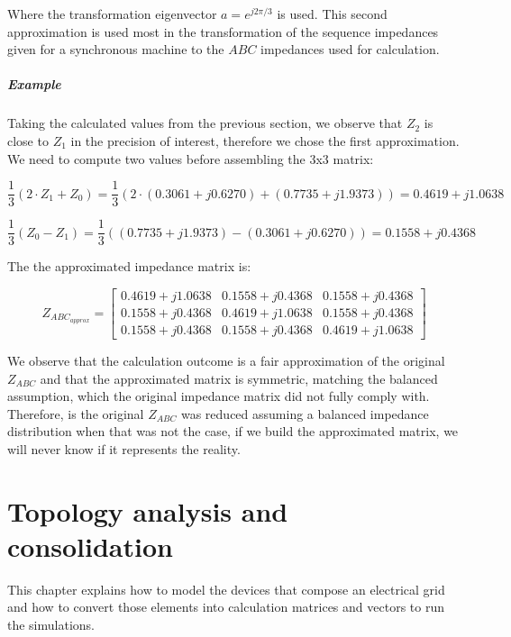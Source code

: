 \documentclass[nols,a4paper,twoside,notoc,fleqn]{tufte-book}
\begin{document}
Where the transformation eigenvector $a=e^{j2 \pi / 3}$ is used. This second approximation is used most in the transformation of the sequence impedances given for a synchronous machine to the $ABC$ impedances used for calculation.

\paragraph{Example}
Taking the calculated values from the previous section, we observe that $Z_2$ is close to $Z_1$ in the precision of interest, therefore we chose the first approximation. We need to compute two values before assembling the 3x3 matrix:

$$
\frac{1}{3}(2 \cdot Z_1 + Z_0) = \frac{1}{3} (2\cdot(0.3061 + j 0.6270) + (0.7735 + j 1.9373)) = 0.4619 + j1.0638
$$

$$
\frac{1}{3} (Z_0 - Z_1) = \frac{1}{3}((0.7735 + j 1.9373) - (0.3061 + j 0.6270)) = 0.1558 + j0.4368
$$

The the approximated impedance matrix is:

$$
Z_{ABC_{approx}} = \left[ \begin{array}{ccc}
0.4619 + j1.0638 & 0.1558 + j0.4368 & 0.1558 + j0.4368 \\
0.1558 + j0.4368 & 0.4619 + j1.0638 & 0.1558 + j0.4368 \\ 
0.1558 + j0.4368 & 0.1558 + j0.4368 & 0.4619 + j1.0638
\end{array} \right]
$$

We observe that the calculation outcome is a fair approximation of the original $Z_{ABC}$ and that the approximated matrix is symmetric, matching the balanced assumption, which the original impedance matrix did not fully comply with. Therefore, is the original $Z_{ABC}$ was reduced assuming a balanced impedance distribution when that was not the case, if we build the approximated matrix, we will never know if it represents the reality.





\chapter{Topology analysis and consolidation}

This chapter explains how to model the devices that compose an electrical grid and how to convert those elements into calculation matrices and vectors to run the simulations.
\end{document}
